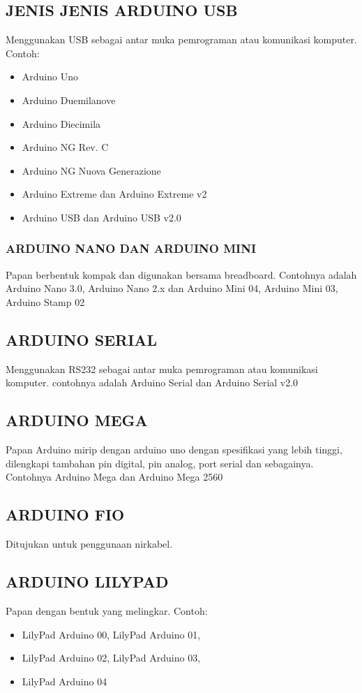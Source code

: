 \subsection {JENIS JENIS ARDUINO USB}
Menggunakan USB sebagai antar muka pemrograman atau komunikasi komputer. Contoh:
\begin{itemize} 
\item Arduino Uno
\item Arduino Duemilanove
\item Arduino Diecimila
\item Arduino NG Rev. C
\item Arduino NG Nuova Generazione
\item Arduino Extreme dan Arduino Extreme v2
\item Arduino USB dan Arduino USB v2.0 
\end{itemize}

\subsubsection {ARDUINO NANO DAN ARDUINO MINI}
Papan berbentuk kompak dan digunakan bersama breadboard. Contohnya adalah Arduino Nano 3.0, Arduino Nano 2.x dan Arduino Mini 04, Arduino Mini 03, Arduino Stamp 02


\subsection {ARDUINO SERIAL}
Menggunakan RS232 sebagai antar muka pemrograman atau komunikasi komputer. contohnya adalah Arduino Serial dan Arduino Serial v2.0  

\subsection {ARDUINO MEGA}
Papan Arduino mirip dengan arduino uno dengan spesifikasi yang lebih tinggi, dilengkapi tambahan pin digital, pin analog, port serial dan sebagainya.  Contohnya Arduino Mega dan Arduino Mega 2560  

\subsection {ARDUINO FIO}
Ditujukan untuk penggunaan nirkabel. 

\subsection {ARDUINO LILYPAD}
Papan dengan bentuk yang melingkar. Contoh: 
\begin{itemize}
\item  LilyPad Arduino 00, LilyPad Arduino 01, 
\item LilyPad Arduino 02, LilyPad Arduino 03,
\item LilyPad Arduino 04
\end{itemize}
